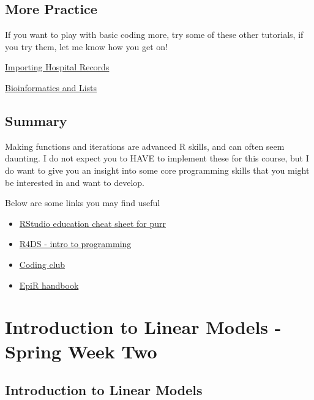 \documentclass[
]{book}
\begin{document}
\hypertarget{more-practice}{%
\section{More Practice}\label{more-practice}}

If you want to play with basic coding more, try some of these other tutorials, if you try them, let me know how you get on!

\href{https://www.gerkelab.com/blog/2018/09/import-directory-csv-purrr-readr/}{Importing Hospital Records}

\href{https://sanderwuyts.com/en/blog/purrr-tutorial/}{Bioinformatics and Lists}

\hypertarget{summary-1}{%
\section{Summary}\label{summary-1}}

Making functions and iterations are advanced R skills, and can often seem daunting. I do not expect you to HAVE to implement these for this course, but I do want to give you an insight into some core programming skills that you might be interested in and want to develop.

Below are some links you may find useful

\begin{itemize}
\item
  \href{https://www.rstudio.com/resources/cheatsheets/}{RStudio education cheat sheet for purr}
\item
  \href{https://r4ds.had.co.nz/program-intro.html}{R4DS - intro to programming}
\item
  \href{https://ourcodingclub.github.io/tutorials/funandloops/\#function}{Coding club}
\item
  \href{https://epirhandbook.com/en/iteration-loops-and-lists.html}{EpiR handbook}
\end{itemize}

\hypertarget{introduction-to-linear-models---spring-week-two}{%
\chapter{Introduction to Linear Models - Spring Week Two}\label{introduction-to-linear-models---spring-week-two}}

\hypertarget{introduction-to-linear-models}{%
\section{Introduction to Linear Models}\label{introduction-to-linear-models}}
\end{document}
